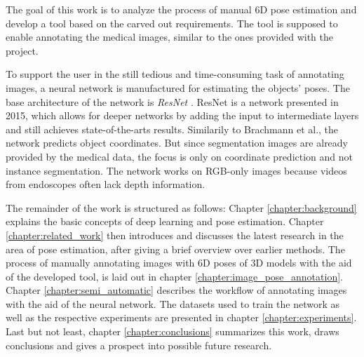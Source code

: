 The goal of this work is to analyze the process of manual 6D pose estimation and develop a tool based on the carved out requirements. The tool is supposed to enable annotating the medical images, similar to the ones provided with the project. 

To support the user in the still tedious and time-consuming task of annotating images, a neural network is manufactured for estimating the objects' poses. The base architecture of the network is \textit{ResNet} \cite{resnet}. ResNet is a network presented in 2015, which allows for deeper networks by adding the input to intermediate layers and still achieves state-of-the-arts results. Similarily to Brachmann et al., the network predicts object coordinates. But since segmentation images are already provided by the medical data, the focus is only on coordinate prediction and not instance segmentation. The network works on RGB-only images because videos from endoscopes often lack depth information. \

The remainder of the work is structured as follows: Chapter \ref{chapter:background} explains the basic concepts of deep learning and pose estimation. Chapter \ref{chapter:related_work} then introduces and discusses the latest research in the area of pose estimation, after giving a brief overview over earlier methods. The process of manually annotating images with 6D poses of 3D models with the aid of the developed tool, is laid out in chapter \ref{chapter:image_pose_annotation}. Chapter \ref{chapter:semi_automatic} describes the workflow of annotating images with the aid of the neural network. The datasets used to train the network as well as the respective experiments are presented in chapter \ref{chapter:experiments}. Last but not least, chapter \ref{chapter:conclusions} summarizes this work, draws conclusions and gives a prospect into possible future research.